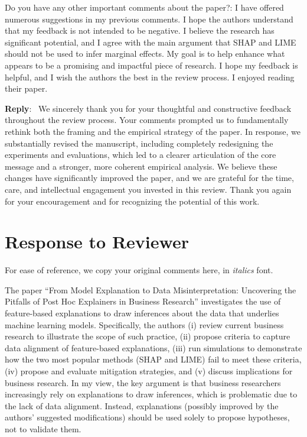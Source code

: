 \documentclass[11pt]{article}
\newcounter{se}[section]
\newcounter{reviewer}
\newcounter{point}[reviewer]
\newcommand{\reviewersection}{\stepcounter{reviewer} \newpage
 \section*{Response to Reviewer \thereviewer}}
\newenvironment{point*}{\bigskip \noindent \rmfamily \itshape}{\medskip} %
\newenvironment{reply}
 {\par\medskip \noindent \begin{sf}\textbf{Reply}:\ }
 {\medskip \end{sf}}
\begin{document}
\begin{point*}
Do you have any other important comments about the paper?: I have offered numerous suggestions in my previous comments. I hope the authors understand that my feedback is not intended to be negative. I believe the research has significant potential, and I agree with the main argument that SHAP and LIME should not be used to infer marginal effects. My goal is to help enhance what appears to be a promising and impactful piece of research. I hope my feedback is helpful, and I wish the authors the best in the review process. I enjoyed reading their paper.
\end{point*}

\begin{reply}
We sincerely thank you for your thoughtful and constructive feedback throughout the review process. Your comments prompted us to fundamentally rethink both the framing and the empirical strategy of the paper. In response, we substantially revised the manuscript, including completely redesigning the experiments and evaluations, which led to a clearer articulation of the core message and a stronger, more coherent empirical analysis. We believe these changes have significantly improved the paper, and we are grateful for the time, care, and intellectual engagement you invested in this review. Thank you again for your encouragement and for recognizing the potential of this work.
\end{reply}

\vspace*{0.5\baselineskip}




\reviewersection{}

\textsf{For ease of reference, we copy your original comments here, in \emph{italics} font.}




\begin{point*}
 The paper “From Model Explanation to Data Misinterpretation: Uncovering the Pitfalls of Post Hoc Explainers in Business Research” investigates the use of feature-based explanations to draw inferences about the data that underlies machine learning models. Specifically, the authors (i) review current business research to illustrate the scope of such practice, (ii) propose criteria to capture data alignment of feature-based explanations, (iii) run simulations to demonstrate how the two most popular methods (SHAP and LIME) fail to meet these criteria, (iv) propose and evaluate mitigation strategies, and (v) discuss implications for business research. In my view, the key argument is that business researchers increasingly rely on explanations to draw inferences, which is problematic due to the lack of data alignment. Instead, explanations (possibly improved by the authors' suggested modifications) should be used solely to propose hypotheses, not to validate them.
\end{point*}
\end{document}
